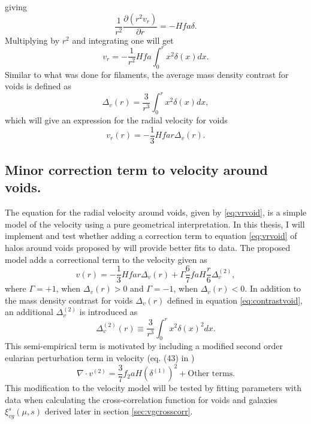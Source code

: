 giving
\begin{equation}
    \frac{1}{r^2}\frac{\partial(r^2v_r)}{\partial r}=-Hfa\delta.
\end{equation}
Multiplying by $r^2$ and integrating one will get
\begin{equation}
    v_r = -\frac{1}{r^2}Hfa\int_0^r x^2\delta(x)dx.
\end{equation}
Similar to what was done for filaments, the average mass density contrast for voids is defined as
\begin{equation}\label{eq:contrastvoid}
    \Delta_v(r)=\frac{3}{r^3}\int_0^r x^2\delta(x)dx,
\end{equation}
which will give an expression for the radial velocity for voids
\begin{equation}\label{eq:vrvoid}
    v_r(r)=-\frac{1}{3}Hfar\Delta_v(r).
\end{equation}
\subsection{Minor correction term to velocity around voids.}\label{sec:vr_correction}
The equation for the radial velocity around voids, given by \ref{eq:vrvoid}, is a simple model of the velocity using a pure geometrical interpretation. In this thesis, I will implement and test whether adding a correction term to equation \ref{eq:vrvoid} of halos around voids proposed by \cite{Achitouv_streaming} will provide better fits to data. The proposed model adds a correctional term to the velocity given as
\begin{equation}\label{eq:achitouv2017}
    v(r)=-\frac{1}{3}Hfar\Delta_v(r)+\Gamma\frac{6}{7}faH\frac{r}{6}\Delta_v^{(2)},
\end{equation}
where $\Gamma=+1$, when $\Delta_v(r)>0$ and $\Gamma=-1$, when $\Delta_v(r)<0$. In addition to the mass density contrast for voids $\Delta_v(r)$ defined in equation \ref{eq:contrastvoid}, an additional $\Delta_v^{(2)}$ is introduced as 
\begin{equation}
    \Delta_v^{(2)}(r)\equiv\frac{3}{r^3}\int_0^rx^2\delta(x)^2dx.
\end{equation}
This semi-empirical term is motivated by including a modified second order eularian perturbation term in velocity (eq. (43) in \cite{Catelan_2ndordervelpert})
\begin{equation}
    \nabla\cdot v^{(2)}=\frac{3}{7}f_2aH(\delta^{(1)})^2+\text{Other terms}.
\end{equation}
This modification to the velocity model will be tested by fitting parameters with data when calculating the cross-correlation function for voids and galaxies $\xi_{vg}^s(\mu,s)$ derived later in section \ref{sec:vgcrosscorr}.
